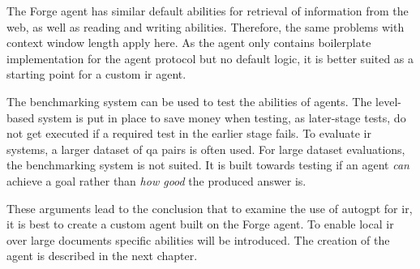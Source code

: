 \documentclass[../main.tex]{subfiles}
\begin{document}
The Forge agent has similar default abilities for retrieval of information from the web,
as well as reading and writing abilities.
Therefore, the same problems with context window length apply here.
As the agent only contains boilerplate implementation for the agent protocol
but no default logic,
it is better suited as a starting point for a custom \gls{ir} agent.

The benchmarking system can be used to test the abilities of agents.
The level-based system is put in place to save money when testing,
as later-stage tests, do not get executed if a required test in the earlier
stage fails.
To evaluate \gls{ir} systems, a larger dataset of \gls{qa} pairs is often used.
For large dataset evaluations, the benchmarking system is not suited.
It is built towards testing if an agent \emph{can} achieve a goal
rather than \emph{how good} the produced answer is.

These arguments lead to the conclusion that to examine the use of \gls{autogpt}
for \gls{ir}, it is best to create a custom agent built on the Forge agent.
To enable local \gls{ir} over large documents specific abilities will be introduced.
The creation of the agent is described in the next chapter.
\end{document}
